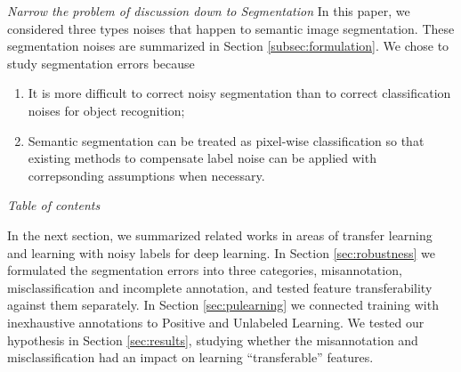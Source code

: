 \noindent \textit{Narrow the problem of discussion down to Segmentation}
\noindent
In this paper, we considered three types noises that happen to semantic image segmentation.
These segmentation noises are summarized in Section \ref{subsec:formulation}.
We chose to study segmentation errors because
\begin{enumerate}
  \item It is more difficult to correct noisy segmentation than to correct classification noises for object recognition;
  \item Semantic segmentation can be treated as pixel-wise classification so that existing methods to compensate label noise can be applied with correpsonding assumptions when necessary.
\end{enumerate}


\noindent \textit{Table of contents}

\noindent
In the next section, we summarized related works in areas of transfer learning and learning with noisy labels for deep learning.
In Section \ref{sec:robustness} we formulated the segmentation errors into three categories, misannotation, misclassification and incomplete annotation, and tested feature transferability against them separately.
In Section \ref{sec:pulearning} we connected training with inexhaustive annotations to Positive and Unlabeled Learning.
We tested our hypothesis in Section \ref{sec:results}, studying whether the misannotation and misclassification had an impact on learning ``transferable'' features.



%

